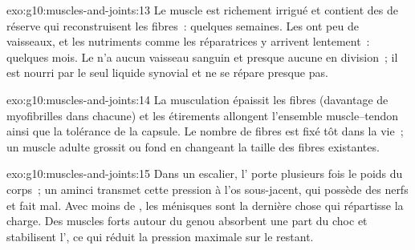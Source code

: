 \begin{solution}{exo:g10:muscles-and-joints:13}
Le muscle est richement irrigué et contient des  de réserve qui
reconstruisent les fibres~: quelques semaines. Les  ont peu de
vaisseaux, et les nutriments comme les  réparatrices y arrivent
lentement~: quelques mois. Le  n'a aucun vaisseau sanguin et
presque aucune  en division~; il est nourri par le seul liquide
synovial et ne se répare presque pas.
\end{solution}

\begin{solution}{exo:g10:muscles-and-joints:14}
La musculation épaissit les fibres (davantage de myofibrilles dans
chacune) et les étirements allongent l'ensemble muscle--tendon ainsi
que la tolérance de la capsule. Le nombre de fibres est fixé tôt dans
la vie~; un muscle adulte grossit ou fond en changeant la taille des
fibres existantes.
\end{solution}

\begin{solution}{exo:g10:muscles-and-joints:15}
Dans un escalier, l' porte plusieurs fois le poids du
corps~; un  aminci transmet cette pression à l'os sous-jacent,
qui possède des nerfs et fait mal. Avec moins de , les
ménisques sont la dernière chose qui répartisse la charge. Des muscles
forts autour du genou absorbent une part du choc et stabilisent
l', ce qui réduit la pression maximale sur le 
restant.
\end{solution}

